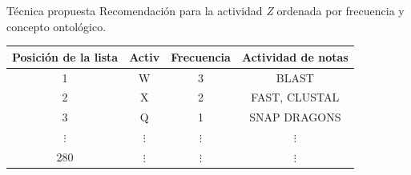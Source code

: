 \begin{frame}		
	\begin{block}{Técnica propuesta}
		Recomendación para la actividad \emph{Z} ordenada por frecuencia y concepto ontológico.
		\begin{table}[!htb]
			\centering
			\begin{tabular}{|c|c|c|c|}  \hline
				\textbf{Posición de la lista} & \textbf{Activ} & \textbf{Frecuencia} & \textbf{Actividad de notas} 	\\ \hline
				1				& W 				& 3 				& BLAST				\\ \hline
				2				& X 				& 2 				& FAST, CLUSTAL		\\ \hline
				3				& Q 				& 1 				& SNAP DRAGONS		\\ \hline
				\(\vdots\)		& \(\vdots\)		& \(\vdots\) 		& \(\vdots\)		\\ \hline
				280				& \(\vdots\)		& \(\vdots\)		& \(\vdots\)	\\ \hline
			\end{tabular}
			\label{tabela_lista_recomendacao_ordenada_frequencia}
		\end{table}		
	\end{block}
\end{frame}